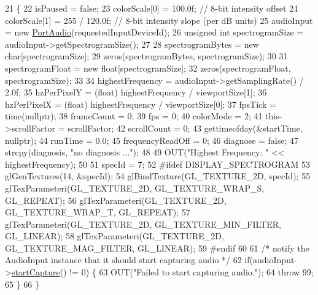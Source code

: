 \begin{DoxyCode}
21                                                                                          \{
22     isPaused = \textcolor{keyword}{false};
23     colorScale[0] = 100.0f;     \textcolor{comment}{// 8-bit intensity offset}
24     colorScale[1] = 255 / 120.0f;     \textcolor{comment}{// 8-bit intensity slope (per dB units)}
25     audioInput = \textcolor{keyword}{new} \mbox{\hyperlink{classPortAudio}{PortAudio}}(requestedInputDeviceId);
26     \textcolor{keywordtype}{unsigned} \textcolor{keywordtype}{int} spectrogramSize = audioInput->getSpectrogramSize();
27 
28     spectrogramBytes = \textcolor{keyword}{new} \textcolor{keywordtype}{char}[spectrogramSize];
29     zeros(spectrogramBytes, spectrogramSize);
30 
31     spectrogramFloat = \textcolor{keyword}{new} \textcolor{keywordtype}{float}[spectrogramSize];
32     zeros(spectrogramFloat, spectrogramSize);
33 
34     highestFrequency = audioInput->getSamplingRate() / 2.0f;
35     hzPerPixelY = (float) highestFrequency / viewportSize[1];
36     hzPerPixelX = (float) highestFrequency / viewportSize[0];
37     fpsTick = time(\textcolor{keyword}{nullptr});
38     frameCount = 0;
39     fps = 0;
40     colorMode = 2;
41     this->scrollFactor = scrollFactor;
42     scrollCount = 0;
43     gettimeofday(&startTime, \textcolor{keyword}{nullptr});
44     runTime = 0.0;
45     frequencyReadOff = 0;
46     diagnose = \textcolor{keyword}{false};
47     strcpy(diagnosis, \textcolor{stringliteral}{"no diagnosis ..."});
48 
49     OUT(\textcolor{stringliteral}{"Highest Frequency: "} << highestFrequency);
50 
51     specId = 7;
52 \textcolor{preprocessor}{#ifdef DISPLAY\_SPECTROGRAM}
53     glGenTextures(14, &specId);
54     glBindTexture(GL\_TEXTURE\_2D, specId);
55     glTexParameteri(GL\_TEXTURE\_2D, GL\_TEXTURE\_WRAP\_S, GL\_REPEAT);
56     glTexParameteri(GL\_TEXTURE\_2D, GL\_TEXTURE\_WRAP\_T, GL\_REPEAT);
57     glTexParameteri(GL\_TEXTURE\_2D, GL\_TEXTURE\_MIN\_FILTER, GL\_LINEAR);
58     glTexParameteri(GL\_TEXTURE\_2D, GL\_TEXTURE\_MAG\_FILTER, GL\_LINEAR);
59 \textcolor{preprocessor}{#endif}
60 
61     \textcolor{comment}{/* notify the AudioInput instance that it should start capturing audio */}
62     \textcolor{keywordflow}{if}(audioInput->\mbox{\hyperlink{classAudioInput_afa753742035f7069f5ef0c2ece6a62fe}{startCapture}}() != 0) \{
63         OUT(\textcolor{stringliteral}{"Failed to start capturing audio."});
64         \textcolor{keywordflow}{throw} 99;
65     \}
66 \}
\end{DoxyCode}
\mbox{\label{structSpectrogramVisualizer_a2b55364382a4ee290918a05946505561}} 
